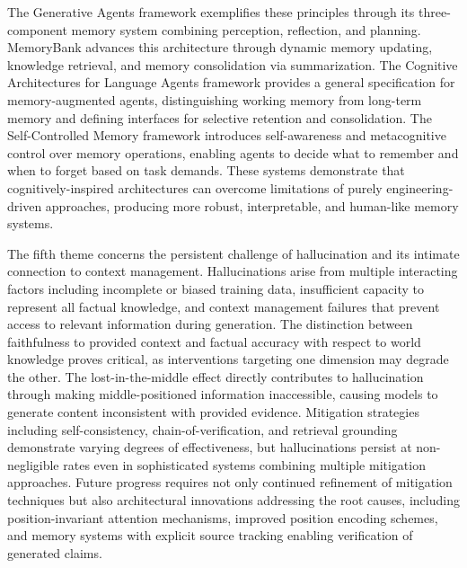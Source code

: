 \documentclass[11pt,letterpaper]{article}
\begin{document}
The Generative Agents framework exemplifies these principles through its three-component memory system combining perception, reflection, and planning. MemoryBank advances this architecture through dynamic memory updating, knowledge retrieval, and memory consolidation via summarization. The Cognitive Architectures for Language Agents framework provides a general specification for memory-augmented agents, distinguishing working memory from long-term memory and defining interfaces for selective retention and consolidation. The Self-Controlled Memory framework introduces self-awareness and metacognitive control over memory operations, enabling agents to decide what to remember and when to forget based on task demands. These systems demonstrate that cognitively-inspired architectures can overcome limitations of purely engineering-driven approaches, producing more robust, interpretable, and human-like memory systems.

The fifth theme concerns the persistent challenge of hallucination and its intimate connection to context management. Hallucinations arise from multiple interacting factors including incomplete or biased training data, insufficient capacity to represent all factual knowledge, and context management failures that prevent access to relevant information during generation. The distinction between faithfulness to provided context and factual accuracy with respect to world knowledge proves critical, as interventions targeting one dimension may degrade the other. The lost-in-the-middle effect directly contributes to hallucination through making middle-positioned information inaccessible, causing models to generate content inconsistent with provided evidence. Mitigation strategies including self-consistency, chain-of-verification, and retrieval grounding demonstrate varying degrees of effectiveness, but hallucinations persist at non-negligible rates even in sophisticated systems combining multiple mitigation approaches. Future progress requires not only continued refinement of mitigation techniques but also architectural innovations addressing the root causes, including position-invariant attention mechanisms, improved position encoding schemes, and memory systems with explicit source tracking enabling verification of generated claims.
\end{document}
